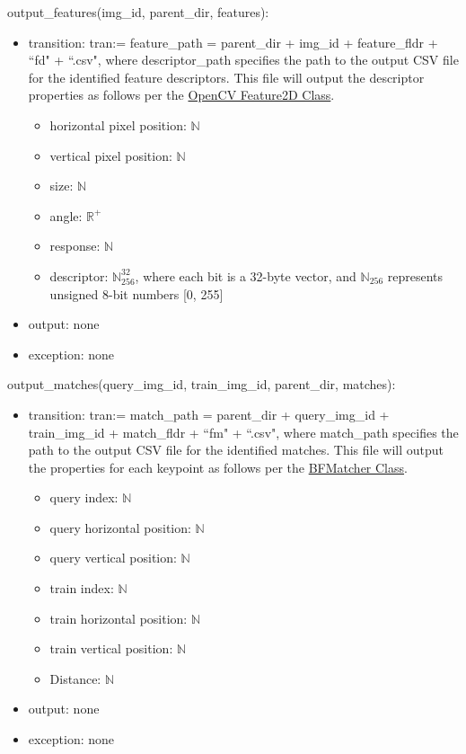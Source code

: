 \documentclass[12pt, titlepage]{article}
\begin{document}
  
  \noindent output\_features(img\_id, parent\_dir, features):
  \begin{itemize}
    \item transition: tran:= feature\_path = parent\_dir + img\_id + feature\_fldr + ``fd" + ``.csv", where descriptor\_path specifies the 
    path to the output CSV file for the identified feature descriptors. This file will output the descriptor properties 
    as follows per the \href{https://docs.opencv.org/4.x/d0/d13/classcv_1_1Feature2D.html}{OpenCV Feature2D Class}.
    \begin{itemize}
      \item horizontal pixel position: $\mathbb{N}$
      \item vertical pixel position: $\mathbb{N}$
      \item size: $\mathbb{N}$
      \item angle: $\mathbb{R}^{+}$
      \item response: $\mathbb{N}$
      \item descriptor: $\mathbb{N}_{256}^{32}$, where each bit is a 32-byte vector, and 
      $\mathbb{N}_{256}$ represents unsigned 8-bit numbers [0, 255]
    \end{itemize}
  \item output: none 
  \item exception: none 
  \end{itemize}
  
  
  \noindent output\_matches(query\_img\_id, train\_img\_id, parent\_dir, matches):
  \begin{itemize}
    \item transition: tran:= match\_path = parent\_dir + query\_img\_id + train\_img\_id + match\_fldr + ``fm" + ``.csv", 
    where match\_path specifies the path to the output CSV file for the identified matches. 
    This file will output the properties for each keypoint as 
    follows per the \href{https://docs.opencv.org/3.4/d3/da1/classcv_1_1BFMatcher.html}{BFMatcher Class}.
    \begin{itemize}
      \item query index: $\mathbb{N}$
      \item query horizontal position: $\mathbb{N}$
      \item query vertical position: $\mathbb{N}$
      \item train index: $\mathbb{N}$
      \item train horizontal position: $\mathbb{N}$
      \item train vertical position: $\mathbb{N}$
      \item Distance: $\mathbb{N}$
    \end{itemize}
    \item output: none
    \item exception: none
  \end{itemize}
\end{document}
